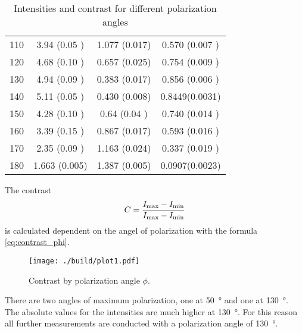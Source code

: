 \begin{table}[H]
\begin{tabular}{S[table-format=3.0] S S S[table-format=1.4(2)]}
		110                             & 3.94  (0.05 )              & 1.077 (0.017)              & 0.570 (0.007 ) \\
		120                             & 4.68  (0.10 )              & 0.657 (0.025)              & 0.754 (0.009 ) \\
		130                             & 4.94  (0.09 )              & 0.383 (0.017)              & 0.856 (0.006 ) \\
		140                             & 5.11  (0.05 )              & 0.430 (0.008)              & 0.8449(0.0031) \\
		150                             & 4.28  (0.10 )              & 0.64  (0.04 )              & 0.740 (0.014 ) \\
		160                             & 3.39  (0.15 )              & 0.867 (0.017)              & 0.593 (0.016 ) \\
		170                             & 2.35  (0.09 )              & 1.163 (0.024)              & 0.337 (0.019 ) \\
		180                             & 1.663 (0.005)              & 1.387 (0.005)              & 0.0907(0.0023) \\
		\bottomrule
	\end{tabular}
	\caption{Intensities and contrast for different polarization angles}\label{tab:contrast}
\end{table}

The contrast
\begin{align}
	C = \frac{I_\text{max} -I_\text{min}}{I_\text{max}-I_\text{min}}
\end{align}
is calculated dependent on the angel of polarization with the formula \eqref{eq:contrast_phi}.

\begin{figure}
	\centering
	\texttt{[image: ./build/plot1.pdf]}
	\caption{Contrast by polarization angle $\phi$.}\label{fig:contrast}
\end{figure}

There are two angles of maximum polarization, one at \qty{50}{\degree} and one
at \qty{130}{\degree}. The absolute values for the intensities are much higher
at \qty{130}{\degree}. For this reason all further measurements are conducted
with a polarization angle of \qty{130}{\degree}.


